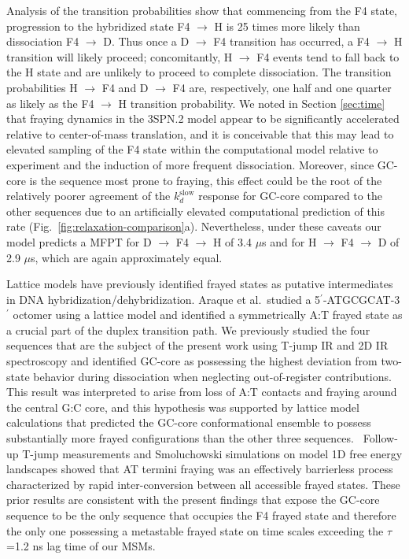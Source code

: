 \documentclass[journal=jpcbfk,manuscript=article]{achemso}
\begin{document}
Analysis of the transition probabilities show that commencing from the F4 state, progression to the hybridized state F4 $\rightarrow$ H is 25 times more likely than dissociation F4 $\rightarrow$ D. Thus once a D $\rightarrow$ F4 transition has occurred, a F4 $\rightarrow$ H transition will likely proceed; concomitantly, H $\rightarrow$ F4 events tend to fall back to the H state and are unlikely to proceed to complete dissociation. The transition probabilities H $\rightarrow$ F4 and D $\rightarrow$ F4 are, respectively, one half and one quarter as likely as the F4 $\rightarrow$ H transition probability. We noted in Section \ref{sec:time} that fraying dynamics in the 3SPN.2 model appear to be significantly accelerated relative to center-of-mass translation, and it is conceivable that this may lead to elevated sampling of the F4 state within the computational model relative to experiment and the induction of more frequent dissociation. Moreover, since GC-core is the sequence most prone to fraying, this effect could be the root of the relatively poorer agreement of the $k_d^\mathrm{slow}$ response for GC-core compared to the other sequences due to an artificially elevated computational prediction of this rate (Fig.~\ref{fig:relaxation-comparison}a). Nevertheless, under these caveats our model predicts a MFPT for D $\rightarrow$ F4 $\rightarrow$ H of 3.4 $\mu$s and for H $\rightarrow$ F4 $\rightarrow$ D of 2.9 $\mu$s, which are again approximately equal.


Lattice models have previously identified frayed states as putative intermediates in DNA hybridization/dehybridization.\citep{Araque2016LatticeCooperativity, Phys2019,Sanstead2016} Araque et al.\ studied a 5$^\prime$-ATGCGCAT-3$^\prime$ octomer using a lattice model and identified a symmetrically A:T frayed state as a crucial part of the duplex transition path.\citep{Araque2016LatticeCooperativity} We previously studied the four sequences that are the subject of the present work using T-jump IR and 2D IR spectroscopy and identified GC-core as possessing the highest deviation from two-state behavior during dissociation when neglecting out-of-register contributions.\citep{Sanstead2016} This result was interpreted to arise from loss of A:T contacts and fraying around the central G:C core, and this hypothesis was supported by lattice model calculations that predicted the GC-core conformational ensemble to possess substantially more frayed configurations than the other three sequences.~\citep{Phys2019} Follow-up T-jump measurements and Smoluchowski simulations on model 1D free energy landscapes showed that AT termini fraying was an effectively barrierless process characterized by rapid inter-conversion between all accessible frayed states.\citep{Sanstead2018DirectDehybridization} These prior results are consistent with the present findings that expose the GC-core sequence to be the only sequence that occupies the F4 frayed state and therefore the only one possessing a metastable frayed state on time scales exceeding the $\tau$=1.2 ns lag time of our MSMs.
\end{document}
